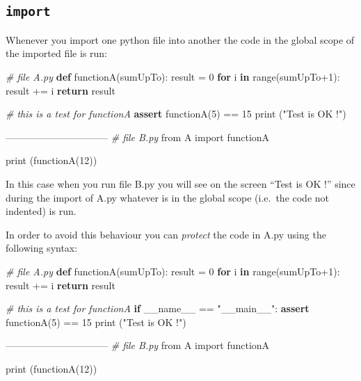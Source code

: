 \documentclass[11pt]{article}
\newenvironment{Shaded}{}{}
\newcommand{\KeywordTok}[1]{\textcolor[rgb]{0.00,0.44,0.13}{\textbf{{#1}}}}
\newcommand{\DecValTok}[1]{\textcolor[rgb]{0.25,0.63,0.44}{{#1}}}
\newcommand{\StringTok}[1]{\textcolor[rgb]{0.25,0.44,0.63}{{#1}}}
\newcommand{\CommentTok}[1]{\textcolor[rgb]{0.38,0.63,0.69}{\textit{{#1}}}}
\newcommand{\NormalTok}[1]{{#1}}
\newcommand{\ImportTok}[1]{{#1}}
\newcommand{\VariableTok}[1]{\textcolor[rgb]{0.10,0.09,0.49}{{#1}}}
\newcommand{\ControlFlowTok}[1]{\textcolor[rgb]{0.00,0.44,0.13}{\textbf{{#1}}}}
\newcommand{\OperatorTok}[1]{\textcolor[rgb]{0.40,0.40,0.40}{{#1}}}
\newcommand{\BuiltInTok}[1]{{#1}}
\begin{document}
\hypertarget{import}{%
\subsection{\texorpdfstring{\texttt{import}}{import}}\label{import}}

Whenever you import one python file into another the code in the global
scope of the imported file is run:

\begin{Shaded}
\begin{Highlighting}[]
\CommentTok{# file A.py}
\KeywordTok{def}\NormalTok{ functionA(sumUpTo):}
\NormalTok{    result }\OperatorTok{=} \DecValTok{0}
    \ControlFlowTok{for}\NormalTok{ i }\KeywordTok{in} \BuiltInTok{range}\NormalTok{(sumUpTo}\OperatorTok{+}\DecValTok{1}\NormalTok{):}
\NormalTok{        result }\OperatorTok{+=}\NormalTok{ i}
    \ControlFlowTok{return}\NormalTok{ result}

\CommentTok{# this is a test for functionA}
\ControlFlowTok{assert}\NormalTok{ functionA(}\DecValTok{5}\NormalTok{) }\OperatorTok{==} \DecValTok{15}
\BuiltInTok{print}\NormalTok{ (}\StringTok{"Test is OK !"}\NormalTok{)}

\OperatorTok{--------------------------------}
\CommentTok{# file B.py}
\ImportTok{from}\NormalTok{ A }\ImportTok{import}\NormalTok{ functionA}

\BuiltInTok{print}\NormalTok{ (functionA(}\DecValTok{12}\NormalTok{))}
\end{Highlighting}
\end{Shaded}

In this case when you run file B.py you will see on the screen ``Test is
OK !'' since during the import of A.py whatever is in the global scope
(i.e.~the code not indented) is run.

In order to avoid this behaviour you can \emph{protect} the code in A.py
using the following syntax:

\begin{Shaded}
\begin{Highlighting}[]
\CommentTok{# file A.py}
\KeywordTok{def}\NormalTok{ functionA(sumUpTo):}
\NormalTok{    result }\OperatorTok{=} \DecValTok{0}
    \ControlFlowTok{for}\NormalTok{ i }\KeywordTok{in} \BuiltInTok{range}\NormalTok{(sumUpTo}\OperatorTok{+}\DecValTok{1}\NormalTok{):}
\NormalTok{        result }\OperatorTok{+=}\NormalTok{ i}
    \ControlFlowTok{return}\NormalTok{ result}

\CommentTok{# this is a test for functionA}
\ControlFlowTok{if} \VariableTok{__name__} \OperatorTok{==} \StringTok{"__main__"}\NormalTok{:}
    \ControlFlowTok{assert}\NormalTok{ functionA(}\DecValTok{5}\NormalTok{) }\OperatorTok{==} \DecValTok{15}
    \BuiltInTok{print}\NormalTok{ (}\StringTok{"Test is OK !"}\NormalTok{)}

\OperatorTok{--------------------------------}
\CommentTok{# file B.py}
\ImportTok{from}\NormalTok{ A }\ImportTok{import}\NormalTok{ functionA}

\BuiltInTok{print}\NormalTok{ (functionA(}\DecValTok{12}\NormalTok{))}
\end{Highlighting}
\end{Shaded}
\end{document}
